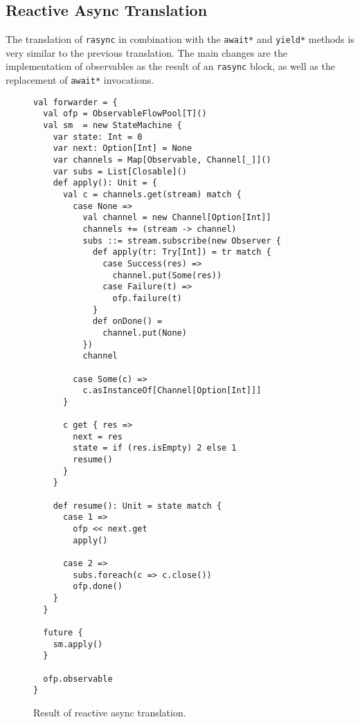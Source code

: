 \documentclass{acm_proc_article-sp}
\begin{document}
\subsection{Reactive Async Translation}\label{sec:rasync-translation}

The translation of \verb|rasync| in combination with the \verb|await*| and
\verb|yield*| methods is very similar to the previous translation. The main
changes are the implementation of observables as the result of an
\verb|rasync| block, as well as the replacement of \verb|await*| invocations.

\begin{figure}[ht!]
  \centering
\lstset{numbers=left,xleftmargin=2em}
\begin{lstlisting}
val forwarder = {
  val ofp = ObservableFlowPool[T]()
  val sm  = new StateMachine {
    var state: Int = 0
    var next: Option[Int] = None
    var channels = Map[Observable, Channel[_]]()
    var subs = List[Closable]()
    def apply(): Unit = {
      val c = channels.get(stream) match {
        case None =>
          val channel = new Channel[Option[Int]]
          channels += (stream -> channel)
          subs ::= stream.subscribe(new Observer {
            def apply(tr: Try[Int]) = tr match {
              case Success(res) =>
                channel.put(Some(res))
              case Failure(t) =>
                ofp.failure(t)
            }
            def onDone() =
              channel.put(None)
          })
          channel

        case Some(c) =>
          c.asInstanceOf[Channel[Option[Int]]]
      }

      c get { res =>
        next = res
        state = if (res.isEmpty) 2 else 1
        resume()
      }
    }

    def resume(): Unit = state match {
      case 1 =>
        ofp << next.get
        apply()

      case 2 =>
        subs.foreach(c => c.close())
        ofp.done()
    }
  }

  future {
    sm.apply()
  }

  ofp.observable
}
\end{lstlisting}
  \caption{Result of reactive async translation.}
  \label{fig:rasync-translation}
\end{figure}
\end{document}
